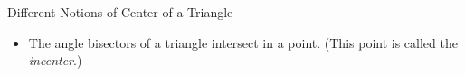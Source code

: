 \begin{exercise}{Different Notions of Center of a Triangle \Coffeecup}
\begin{itemize}
{    }{2in}

\item The angle bisectors of a triangle intersect in a point.  (This point is called the \emph{incenter}.)


\end{itemize}
\end{exercise}

